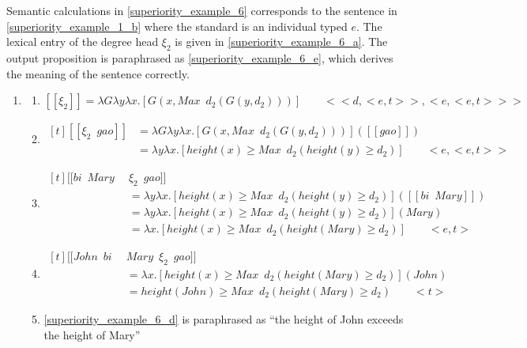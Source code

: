 \documentclass{ctexart}
\begin{document}
Semantic calculations in \ref{superiority_example_6} corresponds to the sentence in \ref{superiority_example_1_b} where the standard is an individual typed $e$. The lexical entry of the degree head $\xi_2$ is given in \ref{superiority_example_6_a}. The output proposition is paraphrased as \ref{superiority_example_6_e}, which derives the meaning of the sentence correctly.

\begin{enumerate}
    \item \label{superiority_example_6}
    \begin{enumerate}
        \item \label{superiority_example_6_a}
        $[\![\xi_2]\!] = \lambda G \lambda y \lambda x.[G(x,Max \enspace d_2(G(y,d_2)))] \qquad <<d,<e,t>>,<e,<e,t>>>$

        \item \label{superiority_example_6_b}
        $\begin{aligned}[t]
            [\![\xi_2 \enspace gao]\!] 
            &= \lambda G \lambda y \lambda x.[G(x,Max \enspace d_2(G(y,d_2)))]([\![gao]\!]) \\
            &= \lambda y \lambda x.[height(x) \geq Max \enspace d_2(height(y) \geq d_2)] \qquad <e,<e,t>>
        \end{aligned}$

        \item \label{superiority_example_6_c}
        $\begin{aligned}[t]
            [\![bi \enspace Mary \enspace & \xi_2 \enspace gao]\!] \\
            &= \lambda y \lambda x.[height(x) \geq Max \enspace d_2(height(y) \geq d_2)]([\![bi \enspace Mary]\!]) \\
            &= \lambda y \lambda x.[height(x) \geq Max \enspace d_2(height(y) \geq d_2)](Mary) \\
            &= \lambda x.[height(x) \geq Max \enspace d_2(height(Mary) \geq d_2)] \qquad <e,t>
        \end{aligned}$

        \item \label{superiority_example_6_d}
        $\begin{aligned}[t]
            [\![John \enspace bi \enspace & Mary \enspace \xi_2 \enspace gao]\!] \\
            &= \lambda x.[height(x) \geq Max \enspace d_2(height(Mary) \geq d_2)](John) \\
            &= height(John) \geq Max \enspace d_2(height(Mary) \geq d_2 ) \qquad <t>
        \end{aligned}$

        \item \label{superiority_example_6_e}
        \ref{superiority_example_6_d} is paraphrased as ``the height of John exceeds the height of Mary''

    \end{enumerate}
\end{enumerate}
\end{document}
